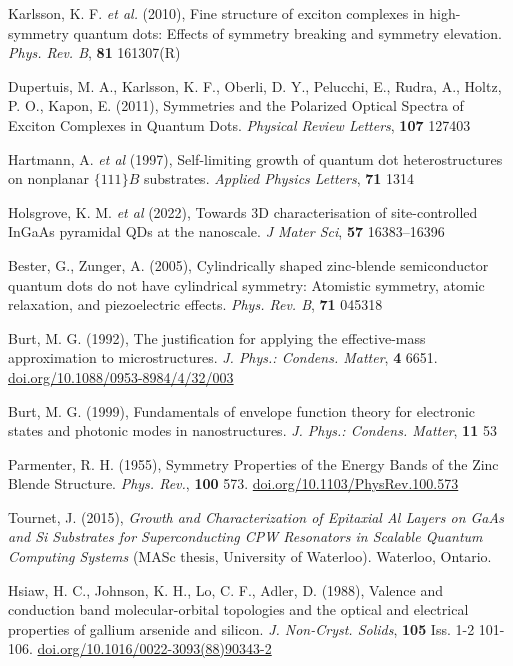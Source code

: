 \documentclass[12pt]{article}
\begin{document}
\begin{thebibliography}{10}
Karlsson, K. F. \textit{et al.} (2010), Fine structure of exciton complexes in high-symmetry quantum dots: Effects of symmetry breaking and symmetry elevation. \textit{Phys. Rev. B}, \textbf{81} 161307(R)

Dupertuis, M. A., Karlsson, K. F., Oberli, D. Y., Pelucchi, E., Rudra, A., Holtz, P. O., Kapon, E. (2011), Symmetries and the Polarized Optical Spectra of Exciton Complexes in Quantum Dots. \textit{Physical Review Letters}, \textbf{107} 127403

Hartmann, A. \textit{et al} (1997), Self-limiting growth of quantum dot heterostructures on nonplanar $\{111\}B$ substrates. \textit{Applied Physics Letters}, \textbf{71} 1314

Holsgrove, K. M. \textit{et al} (2022), Towards 3D characterisation of site-controlled InGaAs pyramidal QDs at the nanoscale. \textit{J Mater Sci}, \textbf{57} 16383--16396

Bester, G., Zunger, A. (2005), Cylindrically shaped zinc-blende semiconductor quantum dots do not have cylindrical symmetry: Atomistic symmetry, atomic relaxation, and piezoelectric effects. \textit{Phys. Rev. B}, \textbf{71} 045318

Burt, M. G. (1992), The justification for applying the effective-mass approximation to microstructures. \textit{J. Phys.: Condens. Matter}, \textbf{4} 6651. \href{https://doi.org/10.1088/0953-8984/4/32/003}{doi.org/10.1088/0953-8984/4/32/003}

Burt, M. G. (1999), Fundamentals of envelope function theory for electronic states and photonic modes in nanostructures. \textit{J. Phys.: Condens. Matter}, \textbf{11} 53

Parmenter, R. H. (1955), Symmetry Properties of the Energy Bands of the Zinc Blende Structure. \textit{Phys. Rev.}, \textbf{100} 573. \href{https://doi.org/10.1103/PhysRev.100.573}{doi.org/10.1103/PhysRev.100.573}

Tournet, J. (2015), \textit{Growth and Characterization of Epitaxial Al Layers on GaAs and Si Substrates for Superconducting CPW Resonators in Scalable Quantum Computing Systems} (MASc thesis, University of Waterloo). Waterloo, Ontario.

Hsiaw, H. C., Johnson, K. H., Lo, C. F., Adler, D. (1988), Valence and conduction band molecular-orbital topologies and the optical and electrical properties of gallium arsenide and silicon. \textit{J. Non-Cryst. Solids}, \textbf{105} Iss. 1-2 101-106. \href{https://doi.org/10.1016/0022-3093(88)90343-2}{doi.org/10.1016/0022-3093(88)90343-2}


\end{thebibliography}
\end{document}
